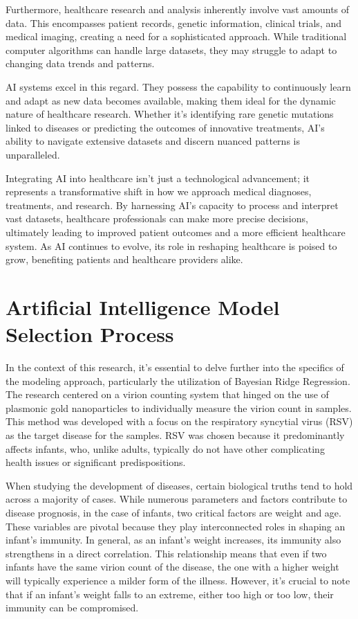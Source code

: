\documentclass{article}
\begin{document}
Furthermore, healthcare research and analysis inherently involve vast amounts of
data. This encompasses patient records, genetic information, clinical trials, and medical
imaging, creating a need for a sophisticated approach. While traditional computer
algorithms can handle large datasets, they may struggle to adapt to changing data trends
and patterns.

AI systems excel in this regard. They possess the capability to continuously learn
and adapt as new data becomes available, making them ideal for the dynamic nature of
healthcare research. Whether it's identifying rare genetic mutations linked to diseases or
predicting the outcomes of innovative treatments, AI's ability to navigate extensive
datasets and discern nuanced patterns is unparalleled.

Integrating AI into healthcare isn't just a technological advancement; it represents
a transformative shift in how we approach medical diagnoses, treatments, and research.
By harnessing AI's capacity to process and interpret vast datasets, healthcare
professionals can make more precise decisions, ultimately leading to improved patient
outcomes and a more efficient healthcare system. As AI continues to evolve, its role in
reshaping healthcare is poised to grow, benefiting patients and healthcare providers alike.



\section{Artificial Intelligence Model Selection Process}
In the context of this research, it's essential to delve further into the specifics of the
modeling approach, particularly the utilization of Bayesian Ridge Regression. The
research centered on a virion counting system that hinged on the use of plasmonic gold
nanoparticles to individually measure the virion count in samples. This method was
developed with a focus on the respiratory syncytial virus (RSV) as the target disease for
the samples. RSV was chosen because it predominantly affects infants, who, unlike
adults, typically do not have other complicating health issues or significant
predispositions.

When studying the development of diseases, certain biological truths tend to hold
across a majority of cases. While numerous parameters and factors contribute to disease
prognosis, in the case of infants, two critical factors are weight and age. These variables
are pivotal because they play interconnected roles in shaping an infant's immunity. In
general, as an infant's weight increases, its immunity also strengthens in a direct
correlation. This relationship means that even if two infants have the same virion count of
the disease, the one with a higher weight will typically experience a milder form of the
illness. However, it's crucial to note that if an infant's weight falls to an extreme, either
too high or too low, their immunity can be compromised.
\end{document}
